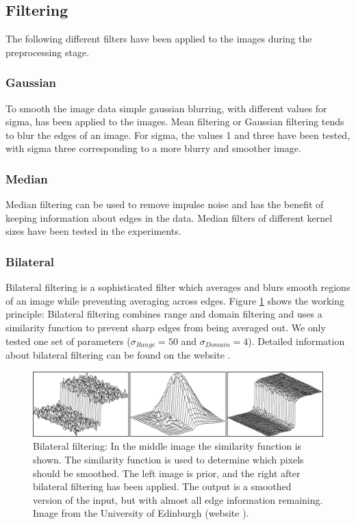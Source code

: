 \documentclass[journal]{IEEEtran}
\begin{document}
\subsection{Filtering}
The following different filters have been applied to the images during the preprocessing stage.
\subsubsection{Gaussian}
To smooth the image data simple gaussian blurring, with different values for sigma, has been applied to the images. Mean filtering or Gaussian filtering tends to blur the edges of an image. For sigma, the values 1 and three have been tested, with sigma three corresponding to a more blurry and smoother image.
\subsubsection{Median}
Median filtering can be used to remove impulse noise and has the benefit of keeping information about edges in the data. Median filters of different kernel sizes have been tested in the experiments.
\subsubsection{Bilateral}
Bilateral filtering is a sophisticated filter which averages and blurs smooth regions of an image while preventing averaging across edges. Figure \ref{fig:bilat} shows the working principle: Bilateral filtering combines range and domain filtering and uses a similarity function to prevent sharp edges from being averaged out. We only tested one set of parameters ($\sigma_{Range} = 50$ and $\sigma_{Domain}= 4$). Detailed information about bilateral filtering can be found on the website \cite{bilateral}.

\begin{figure}[!t]
\centering
\includegraphics[width=\linewidth]{img/bilat}
\caption{Bilateral filtering: In the middle image the similarity function is shown. The similarity function is used to determine which pixels should be smoothed. The left image is prior, and the right after bilateral filtering has been applied. The output is a smoothed version of the input, but with almost all edge information remaining. Image from the  University of Edinburgh (website \cite{bilateral}).}
\label{fig:bilat}
\end{figure}
\end{document}
